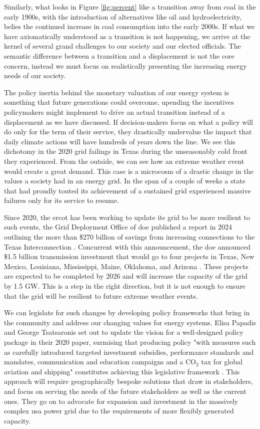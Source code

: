 Similarly, what looks in Figure \ref{fig:percent} like a transition away from
coal in the early 1900s, with the introduction of alternatives like oil and
hydroelectricity, belies the continued increase in coal consumption into the
early 2000s. If what we have axiomatically understood as a transition is not
happening, we arrive at the kernel of several grand challenges to our society
and our elected officials. The semantic difference between a transition and a
displacement is not the core concern, instead we must focus on realistically
presenting the increasing energy needs of our society.

The policy inertia behind the monetary valuation of our energy system is
something that future generations could overcome, upending the incentives
policymakers might implement to drive an actual transition instead of a
displacement as we have discussed. If decision-makers focus on what a policy
will do only for the term of their service, they drastically undervalue the
impact that daily climate actions will have hundreds of years down the line. We
see this dichotomy in the 2020 grid failings in Texas during the unseasonably
cold front they experienced. From the outside, we can see how an extreme
weather event would create a great demand. This case is a microcosm of a
drastic change in the values a society had in an energy grid. In the span of a
couple of weeks a state that had proudly touted its achievement of a sustained
grid \cite{texas_ercot_nodate} experienced massive failures only for its
service to resume.

Since 2020, the \gls{ercot} has been working to update its grid to be more
resilient to such events, the Grid Deployment Office of \gls{doe} published a
report in 2024 outlining the more than \$270 billion of savings from increasing
connections to the Texas Interconnection
\cite{doe_transmission_planning_study_2024}. Concurrent with this announcement,
the \gls{doe} announced \$1.5 billion transmission investment that would go to
four projects in Texas, New Mexico, Louisiana, Mississippi, Maine, Oklahoma,
and Arizona \cite{doe_tran_announce_2024}. These projects are expected to be
completed by 2026 and will increase the capacity of the grid by 1.5 GW. This is
a step in the right direction, but it is not enough to ensure that the grid
will be resilient to future extreme weather events.

We can legislate for such changes by developing policy frameworks that bring in
the community and address our changing values for energy systems. Elisa Papadis and George Tsatsaronis set out to update the vision for a well-designed policy package in their 2020 paper, surmising that producing policy "with measures such as carefully introduced targeted investment subsidies, performance standards and mandates, communication and education campaigns and a CO$_2$ tax for global aviation and shipping" constitutes achieving this legislative framework \cite{papadis_challenges_2020}. This approach will require geographically bespoke solutions that draw in stakeholders, and focus on serving the needs of the future stakeholders as well as the current ones. They go on to advocate for expansion and investment in the massively complex \gls{usa} power grid due to the requirements of more flexibly generated capacity.

